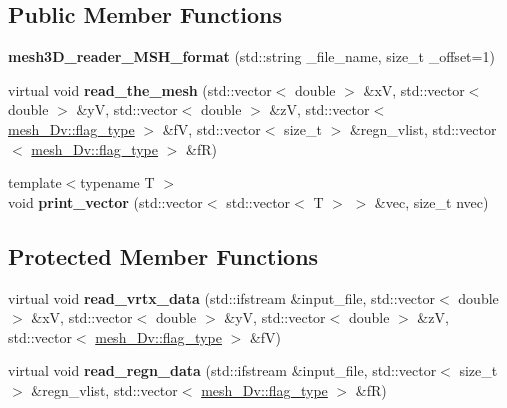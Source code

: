 \subsection*{Public Member Functions}
\begin{DoxyCompactItemize}
\item 
\mbox{\label{classStemMesh3D_1_1mesh3D__reader__MSH__format_a67c1165302d6a97406675d39993666f6}} 
{\bfseries mesh3\+D\+\_\+reader\+\_\+\+M\+S\+H\+\_\+format} (std\+::string \+\_\+file\+\_\+name, size\+\_\+t \+\_\+offset=1)
\item 
\mbox{\label{classStemMesh3D_1_1mesh3D__reader__MSH__format_a8b169633cf81623a612493c54a0c7457}} 
virtual void {\bfseries read\+\_\+the\+\_\+mesh} (std\+::vector$<$ double $>$ \&xV, std\+::vector$<$ double $>$ \&yV, std\+::vector$<$ double $>$ \&zV, std\+::vector$<$ \hyperlink{classStemMesh3D_1_1mesh__3Dv_a9544cba555b60f17f04fcd1689314338}{mesh\+\_\+Dv\+::flag\+\_\+type} $>$ \&fV, std\+::vector$<$ size\+\_\+t $>$ \&regn\+\_\+vlist, std\+::vector$<$ \hyperlink{classStemMesh3D_1_1mesh__3Dv_a9544cba555b60f17f04fcd1689314338}{mesh\+\_\+Dv\+::flag\+\_\+type} $>$ \&fR)
\item 
\mbox{\label{classStemMesh3D_1_1mesh3D__reader__MSH__format_af5e4903620880fa64f9d42da9a419e53}} 
{\footnotesize template$<$typename T $>$ }\\void {\bfseries print\+\_\+vector} (std\+::vector$<$ std\+::vector$<$ T $>$ $>$ \&vec, size\+\_\+t nvec)
\end{DoxyCompactItemize}
\subsection*{Protected Member Functions}
\begin{DoxyCompactItemize}
\item 
\mbox{\label{classStemMesh3D_1_1mesh3D__reader__MSH__format_a9bdd28a087cd1f0d91b403d5464b7545}} 
virtual void {\bfseries read\+\_\+vrtx\+\_\+data} (std\+::ifstream \&input\+\_\+file, std\+::vector$<$ double $>$ \&xV, std\+::vector$<$ double $>$ \&yV, std\+::vector$<$ double $>$ \&zV, std\+::vector$<$ \hyperlink{classStemMesh3D_1_1mesh__3Dv_a9544cba555b60f17f04fcd1689314338}{mesh\+\_\+Dv\+::flag\+\_\+type} $>$ \&fV)
\item 
\mbox{\label{classStemMesh3D_1_1mesh3D__reader__MSH__format_a9439cde7f173dba6130178047ccdc3ce}} 
virtual void {\bfseries read\+\_\+regn\+\_\+data} (std\+::ifstream \&input\+\_\+file, std\+::vector$<$ size\+\_\+t $>$ \&regn\+\_\+vlist, std\+::vector$<$ \hyperlink{classStemMesh3D_1_1mesh__3Dv_a9544cba555b60f17f04fcd1689314338}{mesh\+\_\+Dv\+::flag\+\_\+type} $>$ \&fR)
\end{DoxyCompactItemize}
